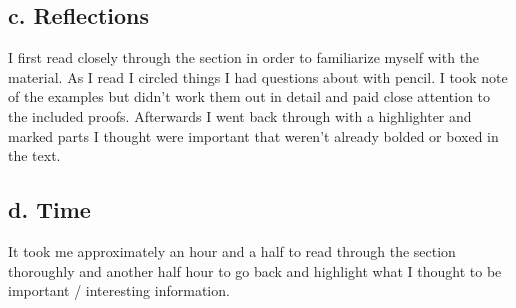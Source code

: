 \documentclass[a4paper, 11pt]{article}
\begin{document}
	\subsection*{c. Reflections}
	I first read closely through the section in order to familiarize myself with the material. As I read I circled things I had questions about with pencil. I took note of the examples but didn't work them out in detail and paid close attention to the included proofs. Afterwards I went back through with a highlighter and marked parts I thought were important that weren't already bolded or boxed in the text. 
	
	
	\subsection*{d. Time}
	It took me approximately an hour and a half to read through the section thoroughly and another half hour to go back and highlight what I thought to be important / interesting information. 
\end{document}
